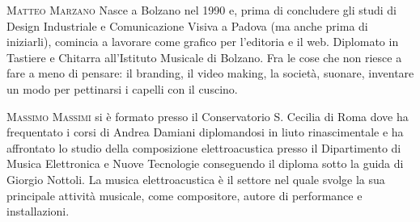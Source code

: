 \documentclass[9pt, twoside, a5paper]{extreport}
\newcommand{\biografia}[2]{%
\noindent \textsc{#1} %
#2 %
\medskip
}%
\begin{document}
\begin{multicols}{2}

\biografia{Matteo Marzano}{Nasce a Bolzano nel 1990 e, prima di concludere gli studi di Design Industriale e Comunicazione Visiva a Padova (ma anche prima di iniziarli), comincia a lavorare come grafico per l’editoria e il web. Diplomato in Tastiere e Chitarra all’Istituto Musicale di Bolzano. Fra le cose che non riesce a fare a meno di pensare: il branding, il video making, la società, suonare, inventare un modo per pettinarsi i capelli con il cuscino.}

\biografia{Massimo Massimi}{si è formato presso il Conservatorio S. Cecilia di Roma dove ha frequentato i corsi di Andrea Damiani diplomandosi in liuto rinascimentale e ha affrontato lo studio della composizione elettroacustica presso il Dipartimento di Musica Elettronica e Nuove Tecnologie conseguendo il diploma sotto la guida di Giorgio Nottoli. La musica elettroacustica è il settore nel quale svolge la sua principale attività musicale, come compositore, autore di performance e installazioni.}


\end{multicols}
\end{document}
